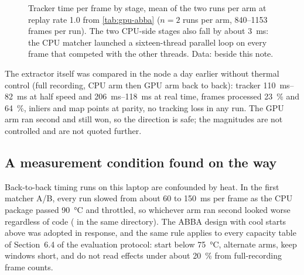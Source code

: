 \documentclass[11pt,a4paper,notitlepage]{report}
\begin{document}
\begin{figure}[htbp]
\centering
{}
\caption{Tracker time per frame by stage, mean of the two runs per arm at
replay rate 1.0 from \cref{tab:gpu-abba} (\(n=2\) runs per arm, 840--1153
frames per run). The two CPU-side stages also fall by about
\SI{3}{\milli\second}: the CPU matcher launched a sixteen-thread parallel
loop on every frame that competed with the other threads. Data:
 beside this note.}
\label{fig:gpu-stages}
\end{figure}

The extractor itself was compared in the node a day earlier without thermal
control (full recording, CPU arm then GPU arm back to back): tracker
\SIrange{110}{82}{\milli\second} at half speed and
\SIrange{206}{118}{\milli\second} at real time, frames processed
\SI{+23}{\percent} and \SI{+64}{\percent}, inliers and map points at parity,
no tracking loss in any run. The GPU arm ran second and still won, so the
direction is safe; the magnitudes are not controlled and are not quoted
further.

\subsection{A measurement condition found on the way}
\label{sec:gpu-thermal}

Back-to-back timing runs on this laptop are confounded by heat. In the first
matcher A/B, every run slowed from about \SI{60}{} to
\SI{150}{\milli\second} per frame as the CPU package passed
\SI{90}{\celsius} and throttled, so whichever arm ran second looked worse
regardless of code ( in the same directory). The
ABBA design with cool starts above was adopted in response, and the same
rule applies to every capacity table of Section~6.4 of the evaluation
protocol: start below \SI{75}{\celsius}, alternate arms, keep windows short,
and do not read effects under about \SI{20}{\percent} from full-recording
frame counts.
\end{document}
